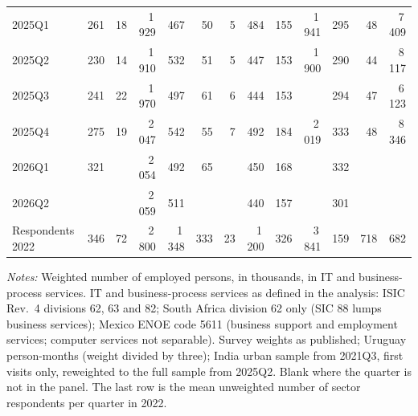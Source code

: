 \begin{table}
\begin{threeparttable}
\begin{tabular}{lrrrrrrrrrrrr}
2025Q1 & 261 & 18 & 1\,929 & 467 & 50 & 5 & 484 & 155 & 1\,941 & 295 & 48 & 7\,409 \\
2025Q2 & 230 & 14 & 1\,910 & 532 & 51 & 5 & 447 & 153 & 1\,900 & 290 & 44 & 8\,117 \\
2025Q3 & 241 & 22 & 1\,970 & 497 & 61 & 6 & 444 & 153 &  & 294 & 47 & 6\,123 \\
2025Q4 & 275 & 19 & 2\,047 & 542 & 55 & 7 & 492 & 184 & 2\,019 & 333 & 48 & 8\,346 \\
2026Q1 & 321 &  & 2\,054 & 492 & 65 &  & 450 & 168 &  & 332 &  &  \\
2026Q2 &  &  & 2\,059 & 511 &  &  & 440 & 157 &  & 301 &  &  \\
\midrule
Respondents 2022 & 346 & 72 & 2\,800 & 1\,348 & 333 & 23 & 1\,200 & 326 & 3\,841 & 159 & 718 & 682 \\
\bottomrule
\end{tabular}
\begin{tablenotes}[flushleft]
\footnotesize
\item \textit{Notes:} Weighted number of employed persons, in thousands, in IT and business-process services. IT and business-process services as defined in the analysis: ISIC Rev.\ 4 divisions 62, 63 and 82; South Africa division 62 only (SIC 88 lumps business services); Mexico ENOE code 5611 (business support and employment services; computer services not separable). Survey weights as published; Uruguay person-months (weight divided by three); India urban sample from 2021Q3, first visits only, reweighted to the full sample from 2025Q2. Blank where the quarter is not in the panel. The last row is the mean unweighted number of sector respondents per quarter in 2022.
\end{tablenotes}
\end{threeparttable}
\end{table}
